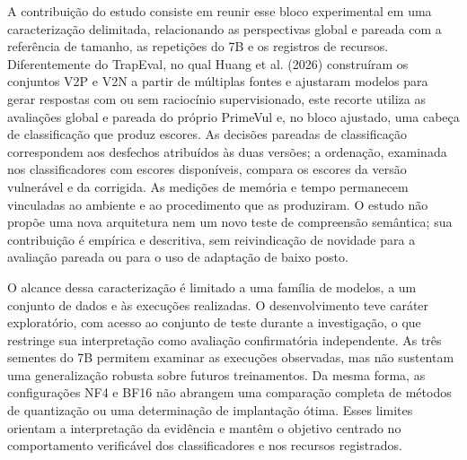 \documentclass[12pt,a4paper]{article}
\begin{document}
A contribuição do estudo consiste em reunir esse bloco experimental em uma caracterização delimitada, relacionando as perspectivas global e pareada com a referência de tamanho, as repetições do 7B e os registros de recursos. Diferentemente do TrapEval, no qual Huang et al. (2026) construíram os conjuntos V2P e V2N a partir de múltiplas fontes e ajustaram modelos para gerar respostas com ou sem raciocínio supervisionado, este recorte utiliza as avaliações global e pareada do próprio PrimeVul e, no bloco ajustado, uma cabeça de classificação que produz escores. As decisões pareadas de classificação correspondem aos desfechos atribuídos às duas versões; a ordenação, examinada nos classificadores com escores disponíveis, compara os escores da versão vulnerável e da corrigida. As medições de memória e tempo permanecem vinculadas ao ambiente e ao procedimento que as produziram. O estudo não propõe uma nova arquitetura nem um novo teste de compreensão semântica; sua contribuição é empírica e descritiva, sem reivindicação de novidade para a avaliação pareada ou para o uso de adaptação de baixo posto.

O alcance dessa caracterização é limitado a uma família de modelos, a um conjunto de dados e às execuções realizadas. O desenvolvimento teve caráter exploratório, com acesso ao conjunto de teste durante a investigação, o que restringe sua interpretação como avaliação confirmatória independente. As três sementes do 7B permitem examinar as execuções observadas, mas não sustentam uma generalização robusta sobre futuros treinamentos. Da mesma forma, as configurações NF4 e BF16 não abrangem uma comparação completa de métodos de quantização ou uma determinação de implantação ótima. Esses limites orientam a interpretação da evidência e mantêm o objetivo centrado no comportamento verificável dos classificadores e nos recursos registrados.

\nocite{ding2024primevul,risse2024limits,huang2026trap,hui2024qwen,hu2021lora,dettmers2023qlora}
\end{document}
